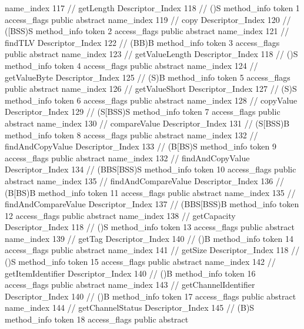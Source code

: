 {{{{{					name_index	117		// getLength
					Descriptor_Index	118		// ()S
				}
				method_info {
					token	1
					access_flags	public abstract
					name_index	119		// copy
					Descriptor_Index	120		// ([BSS)S
				}
				method_info {
					token	2
					access_flags	public abstract
					name_index	121		// findTLV
					Descriptor_Index	122		// (BB)B
				}
				method_info {
					token	3
					access_flags	public abstract
					name_index	123		// getValueLength
					Descriptor_Index	118		// ()S
				}
				method_info {
					token	4
					access_flags	public abstract
					name_index	124		// getValueByte
					Descriptor_Index	125		// (S)B
				}
				method_info {
					token	5
					access_flags	public abstract
					name_index	126		// getValueShort
					Descriptor_Index	127		// (S)S
				}
				method_info {
					token	6
					access_flags	public abstract
					name_index	128		// copyValue
					Descriptor_Index	129		// (S[BSS)S
				}
				method_info {
					token	7
					access_flags	public abstract
					name_index	130		// compareValue
					Descriptor_Index	131		// (S[BSS)B
				}
				method_info {
					token	8
					access_flags	public abstract
					name_index	132		// findAndCopyValue
					Descriptor_Index	133		// (B[BS)S
				}
				method_info {
					token	9
					access_flags	public abstract
					name_index	132		// findAndCopyValue
					Descriptor_Index	134		// (BBS[BSS)S
				}
				method_info {
					token	10
					access_flags	public abstract
					name_index	135		// findAndCompareValue
					Descriptor_Index	136		// (B[BS)B
				}
				method_info {
					token	11
					access_flags	public abstract
					name_index	135		// findAndCompareValue
					Descriptor_Index	137		// (BBS[BSS)B
				}
				method_info {
					token	12
					access_flags	public abstract
					name_index	138		// getCapacity
					Descriptor_Index	118		// ()S
				}
				method_info {
					token	13
					access_flags	public abstract
					name_index	139		// getTag
					Descriptor_Index	140		// ()B
				}
				method_info {
					token	14
					access_flags	public abstract
					name_index	141		// getSize
					Descriptor_Index	118		// ()S
				}
				method_info {
					token	15
					access_flags	public abstract
					name_index	142		// getItemIdentifier
					Descriptor_Index	140		// ()B
				}
				method_info {
					token	16
					access_flags	public abstract
					name_index	143		// getChannelIdentifier
					Descriptor_Index	140		// ()B
				}
				method_info {
					token	17
					access_flags	public abstract
					name_index	144		// getChannelStatus
					Descriptor_Index	145		// (B)S
				}
				method_info {
					token	18
					access_flags	public abstract
}}}}}
